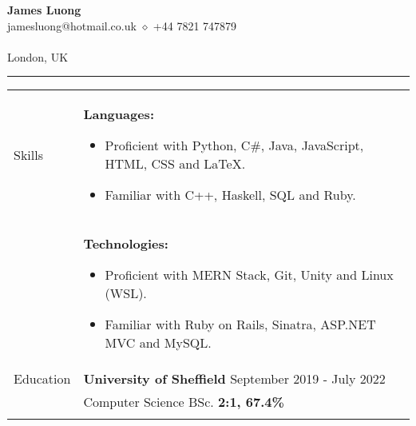 \documentclass[11pt]{article}
\begin{document}
\begin{minipage}[t][0pt]{\linewidth} %
\begin{center}
	{\LARGE\textbf{James Luong}} \\
	jamesluong@hotmail.co.uk $\diamond$ +44 7821 747879 \\
	
	\href{jluong23.github.io/blog}{\color{Blue}{jluong23.github.io/blog}} \\
	
	London, UK \\
	\hrule
\end{center}


\begin{tabular}[t]{p{2cm} p{14cm}}
	{Skills} &
		\textbf{Languages:} 
	    \begin{itemize}
    		\renewcommand{\labelitemi}{$\diamond$}
    			\item Proficient with Python, C\#, Java, JavaScript, HTML, CSS and \LaTeX. 
    			\item Familiar with C++, Haskell, SQL and Ruby.
		\end{itemize} \\ &

		\textbf{Technologies:} 
	    \begin{itemize}
    		\renewcommand{\labelitemi}{$\diamond$}
    			\item Proficient with MERN Stack, Git, Unity and Linux (WSL).
    			\item Familiar with Ruby on Rails, Sinatra, ASP.NET MVC and MySQL.
		\end{itemize} \\
	{Education} &

		\textbf{University of Sheffield} \hfill September 2019 - July 2022 \\ &
		Computer Science BSc. \hfill \textbf{2:1, 67.4\%}  \\ &


\end{tabular}
\end{minipage}
\end{document}
